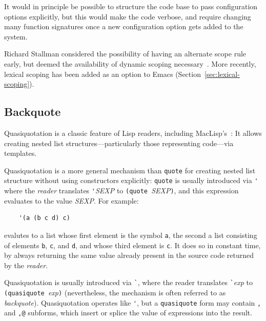 \documentclass[format=acmsmall,screen]{acmart}
\begin{document}
It would in principle be
possible to structure the code base to pass configuration options
explicitly, but this would make the code verbose, and require changing
many function signatures once a new configuration option gets added to
the system.

Richard Stallman considered the possibility of having an alternate
scope rule early, but deemed the availability of dynamic scoping
necessary~\cite{Stallman1981}.  More recently, lexical scoping has
been added as an option to Emacs (Section~\ref{sec:lexical-scoping}).

\subsection{Backquote}
\label{sec:backquote}

Quasiquotation is a classic feature of Lisp readers, including
MacLisp's~\cite{Bawden1999}: It allows creating nested list
structures---particularly those representing code---via templates.

Quasiquotation is a more general mechanism than \texttt{quote} for
creating nested list structure without using constructors explicitly:
\texttt{quote} is usually introduced via \verb|'| where the \emph{reader}
translates \verb|'|\textsl{SEXP} to \texttt{(quote }\textsl{SEXP}\texttt{)},
and this expression evaluates to the value \textsl{SEXP}.
For example:
%
\begin{verbatim}
    '(a (b c d) c)
\end{verbatim}
%
evalutes to a list whose first element is the symbol \texttt{a}, the
second a list consisting of elements \texttt{b}, \texttt{c}, and
\texttt{d}, and whose third element is \texttt{c}.  It does so in constant
time, by always returning the same value already present in the source code
returned by the \emph{reader}.

Quasiquotation is usually introduced via \verb|`|,
where the reader translates \verb|`|\textit{exp} to
\texttt{(quasiquote }\textit{exp}\texttt{)} (nevertheless, the mechanism is
often referred to as \textit{backquote}).  Quasiquotation operates like
\verb|'|, but a \texttt{quasiquote} form may contain \texttt{,} and \texttt{,@}
subforms, which insert or splice the value of expressions into the
result.
\end{document}
